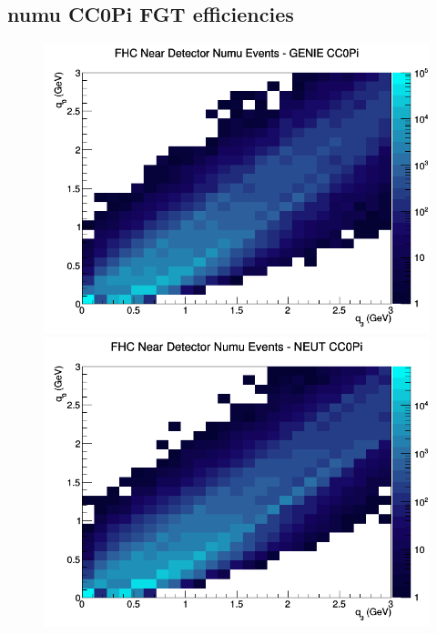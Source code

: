\documentclass[12pt]{article}
\begin{document}
\subsection{numu CC0Pi FGT efficiencies}
\begin{figure}[h]
\includegraphics[width=\linewidth]{eff_q0_q3/FGT/CC0Pi_FHC_ND_numu_q3_q0_GENIE.png}
\endminipage
{}
\includegraphics[width=\linewidth]{eff_q0_q3/FGT/CC0Pi_FHC_ND_numu_q3_q0_NEUT.png}
\endminipage
{}

\end{figure}
\end{document}
